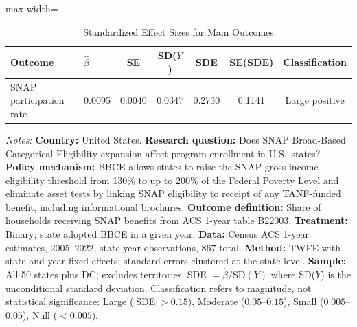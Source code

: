 
\begin{table}[H]
\centering
\caption{Standardized Effect Sizes for Main Outcomes}
\label{tab:sde}
\begin{adjustbox}{max width=\textwidth}
\begin{threeparttable}
\begin{tabular}{llccccc}
\toprule
Outcome & $\hat{\beta}$ & SE & SD($Y$) & SDE & SE(SDE) & Classification \\
\midrule
SNAP participation rate & 0.0095 & 0.0040 & 0.0347 & 0.2730 & 0.1141 & Large positive \\
\bottomrule
\end{tabular}
\begin{tablenotes}[flushleft]
\small
\item \textit{Notes:} \footnotesize \textbf{Country:} United States. \textbf{Research question:} Does SNAP Broad-Based Categorical Eligibility expansion affect program enrollment in U.S.\ states? \textbf{Policy mechanism:} BBCE allows states to raise the SNAP gross income eligibility threshold from 130\% to up to 200\% of the Federal Poverty Level and eliminate asset tests by linking SNAP eligibility to receipt of any TANF-funded benefit, including informational brochures. \textbf{Outcome definition:} Share of households receiving SNAP benefits from ACS 1-year table B22003. \textbf{Treatment:} Binary; state adopted BBCE in a given year. \textbf{Data:} Census ACS 1-year estimates, 2005--2022, state-year observations, 867 total. \textbf{Method:} TWFE with state and year fixed effects; standard errors clustered at the state level. \textbf{Sample:} All 50 states plus DC; excludes territories. SDE $= \hat{\beta} / \text{SD}(Y)$ where SD($Y$) is the unconditional standard deviation. Classification refers to magnitude, not statistical significance: Large ($|$SDE$| > 0.15$), Moderate ($0.05$--$0.15$), Small ($0.005$--$0.05$), Null ($< 0.005$).
\end{tablenotes}
\end{threeparttable}
\end{adjustbox}
\end{table}

